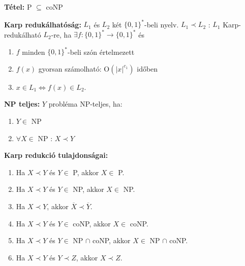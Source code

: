 \documentclass[a4paper]{article}
\begin{document}
\begin{tcolorbox}[size = fbox]
  \textbf{Tétel:} P $\subseteq$ coNP
\end{tcolorbox}

\begin{tcolorbox}[size = fbox]
  \textbf{Karp redukálhatóság:} $L_1$ és $L_2$ két $\{0,1\}^*$-beli nyelv. $L_1 \prec L_2$ : $L_1$ Karp-redukálható $L_2$-re, ha $\exists f: \{0,1\}^* \rightarrow \{0,1\}^*$ és
  \begin{enumerate}[label=(\roman*)]
    \item $f$ minden $\{0,1\}^*$-beli szón értelmezett
    \item $f(x)$ gyorsan számolható: O$(|x|^{c_1})$ időben
    \item $x \in L_1 \Longleftrightarrow f(x) \in L_2$.
  \end{enumerate}
\end{tcolorbox}

\begin{tcolorbox}[size = fbox]
  \textbf{NP teljes:} $Y$ probléma NP-teljes, ha:
  \begin{enumerate}[label=(\roman*)]
    \item $Y \in $ NP
    \item $\forall X \in$ NP : $X \prec Y$
  \end{enumerate}
\end{tcolorbox}

\begin{tcolorbox}[size = fbox]
  \textbf{Karp redukció tulajdonságai:}
  \begin{enumerate}[label=(\roman*)]
    \item Ha $X \prec Y$ és $Y \in $ P, akkor $X \in $ P.
    \item Ha $X \prec Y$ és $Y \in $ NP, akkor $X \in $ NP.
    \item Ha $X \prec Y$, akkor $\overline{X} \prec \overline{Y}$.
    \item Ha $X \prec Y$ és $Y \in $ coNP, akkor $X \in $ coNP.
    \item Ha $X \prec Y$ és $Y \in $ NP $\cap$ coNP, akkor $X \in $ NP $\cap$ coNP.
    \item Ha $X \prec Y$ és $Y \prec Z$, akkor $X \prec Z$.
  \end{enumerate}
\end{tcolorbox}
\end{document}
